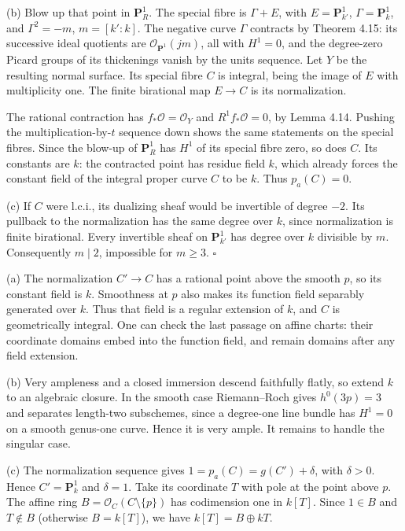 \documentclass[11pt]{article}
\let\chapterexercise\exercise
\renewcommand{\exercise}[2]{\Needspace{8\baselineskip}\chapterexercise{#1}{#2}}
\begin{document}
(b) Blow up that point in $\mathbf P^1_R$. The special fibre is $\Gamma+E$, with $E=\mathbf P^1_{k'}$, $\Gamma=\mathbf P^1_k$, and $\Gamma^2=-m$, $m=[k':k]$. The negative curve $\Gamma$ contracts by Theorem 4.15: its successive ideal quotients are $\mathcal O_{\mathbf P^1}(jm)$, all with $H^1=0$, and the degree-zero Picard groups of its thickenings vanish by the units sequence. Let $Y$ be the resulting normal surface. Its special fibre $C$ is integral, being the image of $E$ with multiplicity one. The finite birational map $E\to C$ is its normalization.

The rational contraction has $f_*\mathcal O=\mathcal O_Y$ and $R^1f_*\mathcal O=0$, by Lemma 4.14. Pushing the multiplication-by-$t$ sequence down shows the same statements on the special fibres. Since the blow-up of $\mathbf P^1_R$ has $H^1$ of its special fibre zero, so does $C$. Its constants are $k$: the contracted point has residue field $k$, which already forces the constant field of the integral proper curve $C$ to be $k$. Thus $p_a(C)=0$.

(c) If $C$ were l.c.i., its dualizing sheaf would be invertible of degree $-2$. Its pullback to the normalization has the same degree over $k$, since normalization is finite birational. Every invertible sheaf on $\mathbf P^1_{k'}$ has degree over $k$ divisible by $m$. Consequently $m\mid2$, impossible for $m\ge3$. \hfill$\square$

\pf (a) The normalization $C'\to C$ has a rational point above the smooth $p$, so its constant field is $k$. Smoothness at $p$ also makes its function field separably generated over $k$. Thus that field is a regular extension of $k$, and $C$ is geometrically integral. One can check the last passage on affine charts: their coordinate domains embed into the function field, and remain domains after any field extension.

(b) Very ampleness and a closed immersion descend faithfully flatly, so extend $k$ to an algebraic closure. In the smooth case Riemann--Roch gives $h^0(3p)=3$ and separates length-two subschemes, since a degree-one line bundle has $H^1=0$ on a smooth genus-one curve. Hence it is very ample. It remains to handle the singular case.

(c) The normalization sequence gives $1=p_a(C)=g(C')+\delta$, with $\delta>0$. Hence $C'=\mathbf P^1_k$ and $\delta=1$. Take its coordinate $T$ with pole at the point above $p$. The affine ring $B=\mathcal O_C(C\setminus\{p\})$ has codimension one in $k[T]$. Since $1\in B$ and $T\notin B$ (otherwise $B=k[T]$), we have $k[T]=B\oplus kT$.
\end{document}
